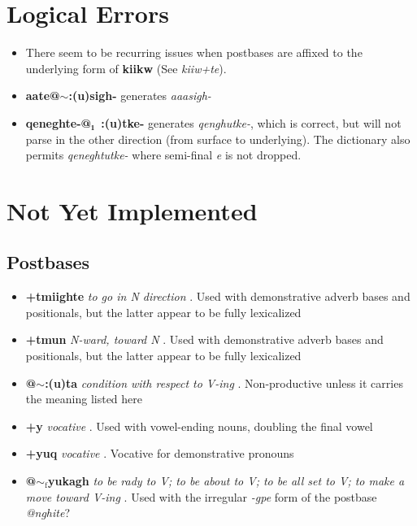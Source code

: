 \documentclass{article}
\begin{document}

\section{Logical Errors}

\begin{itemize}
\renewcommand\labelitemi{$\cdot$}

\item There seem to be recurring issues when postbases are affixed to the underlying form of \textbf{kiikw} (See \textit{kiiw+te}).

\item \textbf{aate@$\sim$:(u)sigh-} generates \textit{aaasigh-}

\item \textbf{qeneghte-@₁~:(u)tke-} generates \textit{qenghutke-}, which is correct, but will not parse in the other direction (from surface to underlying).
%
The dictionary also permits \textit{qeneghtutke-} where semi-final \textit{e} is not dropped.


\end{itemize}



\section{Not Yet Implemented}

\subsection{Postbases}

\begin{itemize}
\renewcommand\labelitemi{$\cdot$}
\item \textbf{+tmiighte} \textit{to go in N direction} . Used with demonstrative adverb bases and positionals, but the latter appear to be fully lexicalized  
\item \textbf{+tmun} \textit{N-ward, toward N} .  Used with demonstrative adverb bases and positionals, but the latter appear to be fully lexicalized  
\item \textbf{@$\sim$:(u)ta} \textit{condition with respect to V-ing} . Non-productive unless it carries the meaning listed here
\item \textbf{+y} \textit{vocative} . Used with vowel-ending nouns, doubling the final vowel
\item \textbf{+yuq} \textit{vocative} . Vocative for demonstrative pronouns 
\item \textbf{@$\sim_\text{f}$yukagh} \textit{to be rady to V; to be about to V; to be all set to V; to make a move toward V-ing} . Used with the irregular \textit{-gpe} form of the postbase \textit{@nghite}?

\end{itemize}
\end{document}
